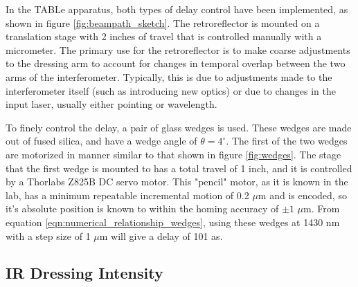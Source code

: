 In the TABLe apparatus, both types of delay control have been implemented, as shown in figure \ref{fig:beampath_sketch}.  The retroreflector is mounted on a translation stage with 2 inches of travel that is controlled manually with a micrometer.  The primary use for the retroreflector is to make coarse adjustments to the dressing arm to account for changes in temporal overlap between the two arms of the interferometer.  Typically, this is due to adjustments made to the interferometer itself (such as introducing new optics) or due to changes in the input laser, usually either pointing or wavelength.  

To finely control the delay, a pair of glass wedges is used.  These wedges are made out of fused silica, and have a wedge angle of $\theta=4^\circ$.  The first of the two wedges are motorized in manner similar to that shown in figure \ref{fig:wedges}.  The stage that the first wedge is mounted to has a total travel of 1 inch, and it is controlled by a Thorlabs Z825B DC servo motor.  This "pencil" motor, as it is known in the lab, has a minimum repeatable incremental motion of 0.2 $\mu$m and is encoded, so it's absolute position is known to within the homing accuracy of $\pm1$ $\mu$m.  From equation \ref{eqn:numerical_relationship_wedges}, using these wedges at 1430 nm with a step size of 1 $\mu$m will give a delay of 101 as.


\subsection{IR Dressing Intensity}
\label{sec:dressing_intensity}

